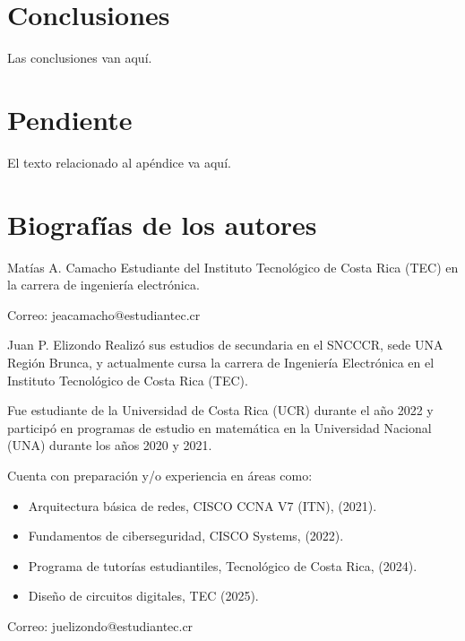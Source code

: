 \documentclass[journal]{IEEEtran}
\begin{document}
\section{Conclusiones}
Las conclusiones van aquí.

\appendices
\section{Pendiente}
El texto relacionado al apéndice va aquí.


\printbibliography

\section{Biografías de los autores}



 
\begin{IEEEbiographynophoto}{Matías A. Camacho}
        Estudiante del Instituto Tecnológico de Costa Rica (TEC) en la carrera de ingeniería electrónica.
        
        Correo: jeacamacho@estudiantec.cr
\end{IEEEbiographynophoto}

\begin{IEEEbiographynophoto}{Juan P. Elizondo}
        Realizó sus estudios de secundaria en el SNCCCR, sede UNA Región Brunca, y actualmente cursa la carrera de Ingeniería Electrónica en el Instituto Tecnológico de Costa Rica (TEC). 
        
        Fue estudiante de la Universidad de Costa Rica (UCR) durante el año 2022 y participó en programas de estudio en matemática en la Universidad Nacional (UNA) durante los años 2020 y 2021. 
        
        Cuenta con preparación y/o experiencia en áreas como:
        \begin{itemize}
            \item Arquitectura básica de redes, CISCO CCNA V7 (ITN), (2021).
            \item Fundamentos de ciberseguridad, CISCO Systems, (2022).
            \item Programa de tutorías estudiantiles, Tecnológico de Costa Rica, (2024).
            \item Diseño de circuitos digitales, TEC (2025).
        \end{itemize}
        
        Correo: juelizondo@estudiantec.cr
\end{IEEEbiographynophoto}



\vfill
\end{document}
